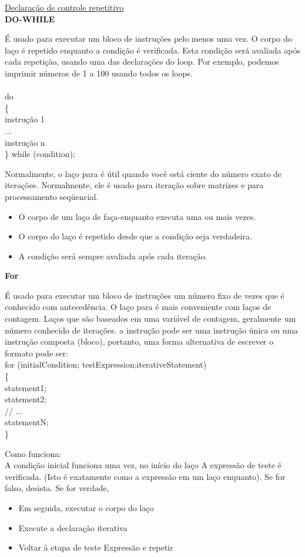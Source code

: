 \documentclass[11pt, letterpaper, portuguese]{article}
\begin{document}
    \underline{Declaração de controle repetitivo}\\
    \textbf{DO-WHILE}\\
    \par{É usado para executar um bloco de instruções pelo menos uma vez. O corpo do laço é repetido enquanto a condição é verificada. Esta condição será avaliada após cada repetição, usando uma das declarações do loop. Por exemplo, podemos imprimir números de 1 a 100 usando todos os loops.}\\ \\
    do\\
    \{ \\
    instrução 1 \\
    ... \\
    instrução n\\
    \} while (condition); \\
    \par{Normalmente, o laço para é útil quando você está ciente do número exato de iterações. Normalmente, ele é usado para iteração sobre matrizes e para processamento seqüencial.}
    
    \begin{itemize}
\item O corpo de um laço de faça-enquanto executa uma ou mais vezes.
\item O corpo do laço é repetido desde que a condição seja verdadeira.
\item A condição será sempre avaliada após cada iteração.
\end{itemize} \vspace{0.5 cm}
\textbf{For} \vspace{0.5 cm}
\par{É usado para executar um bloco de instruções um número fixo de vezes que é conhecido com antecedência. O laço para é mais conveniente com laços de contagem. Laços que são baseados em uma variável de contagem, geralmente um número conhecido de iterações. a instrução pode ser uma instrução única ou uma instrução composta (bloco), portanto, uma forma alternativa de escrever o formato pode ser:}\\

    for (initialCondition; testExpression;iterativeStatement)\\ 
 \{\\
    statement1;\\
    statement2;\\
    // ...\\
    statementN;\\
 \}\\
\par{Como funciona:\\
A condição inicial funciona uma vez, no início do laço A expressão de teste é verificada. (Isto é exatamente como a expressão em um laço enquanto). Se for falso, desista. Se for verdade,
\begin{itemize}
    \item Em seguida, executar o corpo do laço
    \item Execute a declaração iterativa
    \item Voltar à etapa de teste Expressão e repetir
\end{itemize}
}
    
\end{document}
